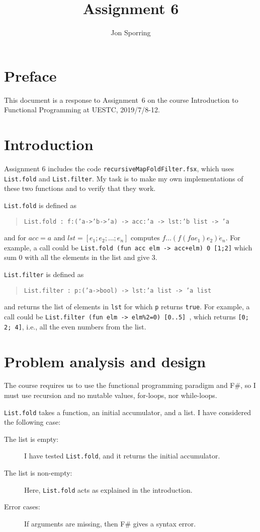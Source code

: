 \documentclass[a4paper]{article}
\title{Assignment 6}
\author{Jon Sporring}
\begin{document}
\maketitle %

\section{Preface}
This document is a response to Assignment~6 on the course Introduction to Functional Programming at UESTC, 2019/7/8-12.

\section{Introduction}
Assignment 6 includes the code \texttt{recursiveMapFoldFilter.fsx},
which uses \texttt{List.fold} and \texttt{List.filter}. My task is to
make my own implementations of these two functions and to verify that they work.

\texttt{List.fold} is defined as
\begin{quote}
  \texttt{List.fold : f:('a->'b->'a) -> acc:'a -> lst:'b list -> 'a}
\end{quote}
and for $acc=a$ and $lst=[e_1;e_2;\dots;e_n]$ computes $f \dots (f (f a e_1) e_2)\dot e_n$. For example, a call could be \texttt{List.fold (fun acc elm -> acc+elm) 0 [1;2]} which sum 0 with all the elements in the list and give 3.

\texttt{List.filter} is defined as
\begin{quote}
  \texttt{List.filter : p:('a->bool) -> lst:'a list -> 'a list}
\end{quote}
and returns the list of elements in \texttt{lst} for which \texttt{p} returns \texttt{true}. For example, a call could be \texttt{List.filter (fun elm -> elm\%2=0) [0..5] }, which returns \texttt{[0; 2; 4]}, i.e., all the even numbers from the list.

\section{Problem analysis and design}
The course requires us to use the functional programming paradigm and F\#, so I must use recursion and no mutable values, for-loops, nor while-loops.

\texttt{List.fold} takes a function, an initial accumulator, and a list. I have considered the following case:
\begin{description}
\item[The list is empty:] I have tested \texttt{List.fold}, and it returns the initial accumulator.
\item[The list is non-empty:] Here, \texttt{List.fold} acts as explained in the introduction.
\item[Error cases:] If arguments are missing, then F\# gives a syntax error.
\end{description}
\end{document}
